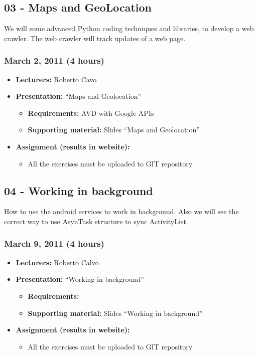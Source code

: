 \documentclass[a4paper]{article}
\begin{document}
\subsection{03 - Maps and GeoLocation}

We will some advanced Python coding techniques and libraries, to
develop a web crawler. The web crawler  will track updates of a web
page.

\subsubsection{March 2, 2011 (4 hours)}

\begin{itemize}
\item \textbf{Lecturers:} Roberto Cavo
\item \textbf{Presentation:} ``Maps and Geolocation''
  \begin{itemize}
  \item \textbf{Requirements:} AVD with Google APIs
  \item \textbf{Supporting material:} Slides ``Maps and Geolocation''
  \end{itemize}
\item \textbf{Assignment (results in website):} 
  \begin{itemize}
  \item All the exercises must be uploaded to GIT repository
  \end{itemize}
\end{itemize}


\subsection{04 - Working in background }

How to use the android services to work in background. Also we will
see the correct way to use AsynTask structure to sync ActivityList.

\subsubsection{March 9, 2011 (4 hours)}

\begin{itemize}
\item \textbf{Lecturers:} Roberto Calvo
\item \textbf{Presentation:} ``Working in background''
  \begin{itemize}
\item \textbf{Requirements:} 
  \item \textbf{Supporting material:} Slides ``Working in background''
  \end{itemize}
\item \textbf{Assignment (results in website):} 
 \begin{itemize}
   \item All the exercises must be uploaded to GIT repository
 \end{itemize}
\end{itemize}
\end{document}

